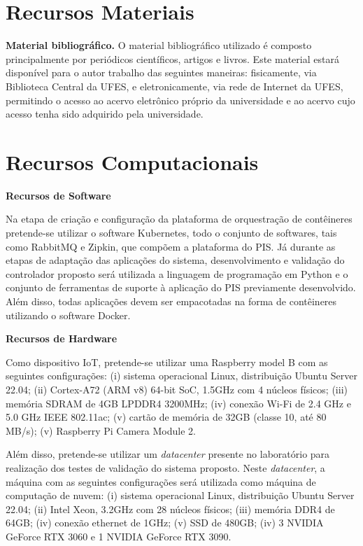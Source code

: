 \section{Recursos Materiais}

\textbf{Material bibliográfico.} O material bibliográfico utilizado é composto principalmente por periódicos científicos, artigos e livros. Este material estará disponível para o autor  trabalho das seguintes maneiras: fisicamente, via Biblioteca Central da UFES, e eletronicamente, via rede de Internet da UFES, permitindo o acesso ao acervo eletrônico próprio da universidade e ao acervo cujo acesso tenha sido adquirido pela universidade.

\section{Recursos Computacionais}

\textbf{Recursos de Software}

Na etapa de criação e configuração da plataforma de orquestração de contêineres pretende-se utilizar o software Kubernetes,  todo o conjunto de softwares, tais como RabbitMQ e Zipkin, que compõem a plataforma do PIS. Já durante as etapas de adaptação das aplicações do sistema, desenvolvimento e validação do controlador proposto será utilizada a linguagem de programação em Python e o conjunto de ferramentas de suporte à aplicação do PIS previamente desenvolvido. Além disso, todas aplicações devem ser empacotadas na forma de contêineres utilizando o software Docker.


\textbf{Recursos de Hardware}

Como dispositivo IoT, pretende-se utilizar uma Raspberry model B com as seguintes configurações: (i) sistema operacional Linux, distribuição Ubuntu Server 22.04; (ii)  Cortex-A72 (ARM v8) 64-bit SoC, 1.5GHz com 4 núcleos físicos; (iii) memória SDRAM de 4GB LPDDR4 3200MHz; (iv) conexão Wi-Fi de 2.4 GHz e 5.0 GHz IEEE 802.11ac; (v) cartão de memória de 32GB (classe 10, até 80 MB/s); (v) Raspberry Pi Camera Module 2. 

Além disso, pretende-se utilizar um \textit{datacenter} presente no laboratório para realização dos testes de validação do sistema proposto. Neste \textit{datacenter}, a máquina com as seguintes configurações será utilizada como máquina de computação de nuvem: (i) sistema operacional Linux, distribuição Ubuntu Server 22.04; (ii)  Intel Xeon, 3.2GHz com 28 núcleos físicos; (iii) memória DDR4 de 64GB; (iv) conexão ethernet de 1GHz; (v) SSD de 480GB; (iv) 3 NVIDIA GeForce RTX 3060 e 1 NVIDIA GeForce RTX 3090.
